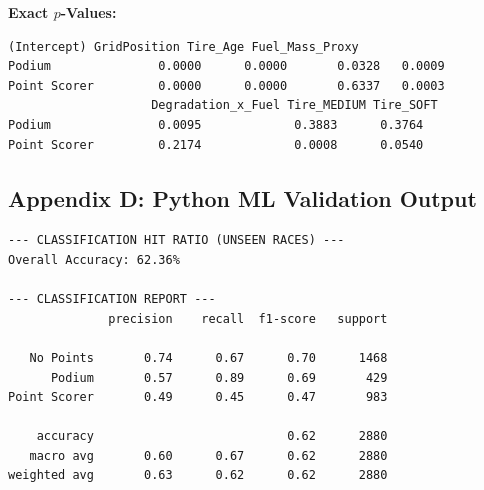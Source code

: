 \textbf{Exact $p$-Values:}
\begin{lstlisting}[basicstyle=\small\ttfamily,breaklines=true,breakatwhitespace=false]
                     (Intercept) GridPosition Tire_Age Fuel_Mass_Proxy
Podium               0.0000      0.0000       0.0328   0.0009
Point Scorer         0.0000      0.0000       0.6337   0.0003
                    Degradation_x_Fuel Tire_MEDIUM Tire_SOFT
Podium               0.0095             0.3883      0.3764
Point Scorer         0.2174             0.0008      0.0540
\end{lstlisting}
\normalsize

\subsection{Appendix D: Python ML Validation Output}

\small
\begin{verbatim}
--- CLASSIFICATION HIT RATIO (UNSEEN RACES) ---
Overall Accuracy: 62.36%

--- CLASSIFICATION REPORT ---
              precision    recall  f1-score   support

   No Points       0.74      0.67      0.70      1468
      Podium       0.57      0.89      0.69       429
Point Scorer       0.49      0.45      0.47       983

    accuracy                           0.62      2880
   macro avg       0.60      0.67      0.62      2880
weighted avg       0.63      0.62      0.62      2880
\end{verbatim}
\normalsize
